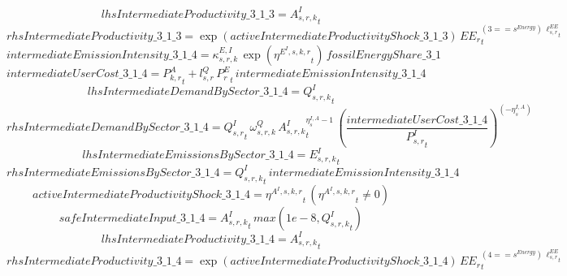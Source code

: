 \begin{dmath*}
lhsIntermediateProductivity\_3\_1\_3 = {{A^{I}_{s,r,k}}}_{t}
\end{dmath*}
\begin{dmath*}
rhsIntermediateProductivity\_3\_1\_3 = \exp\left({activeIntermediateProductivityShock\_3\_1\_3}\right)\, {{EE_r}}_{t}^{\left(3=={{s^{Energy}}}\right)\, {{\ell^{EE}_{s,r}}}_{t}}
\end{dmath*}
\begin{dmath*}
intermediateEmissionIntensity\_3\_1\_4 = {{\kappa^{E,I}_{s,r,k}}}\, \exp\left({{\eta^{E^{I},s,k,r}}}_{t}\right)\, {fossilEnergyShare\_3\_1}
\end{dmath*}
\begin{dmath*}
intermediateUserCost\_3\_1\_4 = {{P^{A}_{k,r}}}_{t}+{{l^{Q}_{s,r}}}\, {{P^E_r}}_{t}\, {intermediateEmissionIntensity\_3\_1\_4}
\end{dmath*}
\begin{dmath*}
lhsIntermediateDemandBySector\_3\_1\_4 = {{Q^{I}_{s,r,k}}}_{t}
\end{dmath*}
\begin{dmath*}
rhsIntermediateDemandBySector\_3\_1\_4 = {{Q^{I}_{s,r}}}_{t}\, {{\omega^{Q}_{s,r,k}}}\, {{A^{I}_{s,r,k}}}_{t}^{{{\eta^{I,A}_{s}}}-1}\, \left(\frac{{intermediateUserCost\_3\_1\_4}}{{{P^{I}_{s,r}}}_{t}}\right)^{\left(-{{\eta^{I,A}_{s}}}\right)}
\end{dmath*}
\begin{dmath*}
lhsIntermediateEmissionsBySector\_3\_1\_4 = {{E^I_{s,r,k}}}_{t}
\end{dmath*}
\begin{dmath*}
rhsIntermediateEmissionsBySector\_3\_1\_4 = {{Q^{I}_{s,r,k}}}_{t}\, {intermediateEmissionIntensity\_3\_1\_4}
\end{dmath*}
\begin{dmath*}
activeIntermediateProductivityShock\_3\_1\_4 = {{\eta^{A^{I},s,k,r}}}_{t}\, \left({{\eta^{A^{I},s,k,r}}}_{t}\neq 0\right)
\end{dmath*}
\begin{dmath*}
safeIntermediateInput\_3\_1\_4 = {{A^{I}_{s,r,k}}}_{t}\, max(1e-8,{{Q^{I}_{s,r,k}}}_{t})
\end{dmath*}
\begin{dmath*}
lhsIntermediateProductivity\_3\_1\_4 = {{A^{I}_{s,r,k}}}_{t}
\end{dmath*}
\begin{dmath*}
rhsIntermediateProductivity\_3\_1\_4 = \exp\left({activeIntermediateProductivityShock\_3\_1\_4}\right)\, {{EE_r}}_{t}^{\left(4=={{s^{Energy}}}\right)\, {{\ell^{EE}_{s,r}}}_{t}}
\end{dmath*}
